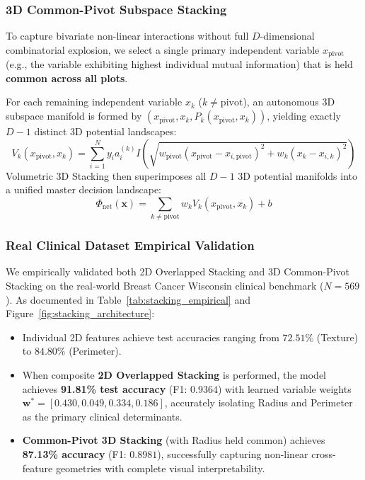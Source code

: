 \documentclass[preprint,review,12pt]{elsarticle}
\begin{document}
\subsubsection{3D Common-Pivot Subspace Stacking}
To capture bivariate non-linear interactions without full $D$-dimensional combinatorial explosion, we select a single primary independent variable $x_{\mathrm{pivot}}$ (e.g., the variable exhibiting highest individual mutual information) that is held \textbf{common across all plots}. 

For each remaining independent variable $x_k$ ($k \ne \mathrm{pivot}$), an autonomous 3D subspace manifold is formed by $(x_{\mathrm{pivot}}, x_k, P_k(x_{\mathrm{pivot}}, x_k))$, yielding exactly $D - 1$ distinct 3D potential landscapes:
\begin{equation}
    V_k(x_{\mathrm{pivot}}, x_k) = \sum_{i=1}^N y_i a_i^{(k)} I\left( \sqrt{w_{\mathrm{pivot}} (x_{\mathrm{pivot}} - x_{i,\mathrm{pivot}})^2 + w_k (x_k - x_{i,k})^2} \right)
\end{equation}
Volumetric 3D Stacking then superimposes all $D - 1$ 3D potential manifolds into a unified master decision landscape:
\begin{equation}
    \Phi_{\mathrm{net}}(\mathbf{x}) = \sum_{k \ne \mathrm{pivot}} w_k V_k(x_{\mathrm{pivot}}, x_k) + b
\end{equation}

\subsubsection{Real Clinical Dataset Empirical Validation}
We empirically validated both 2D Overlapped Stacking and 3D Common-Pivot Stacking on the real-world Breast Cancer Wisconsin clinical benchmark ($N=569$). As documented in Table~\ref{tab:stacking_empirical} and Figure~\ref{fig:stacking_architecture}:
\begin{itemize}
    \item Individual 2D features achieve test accuracies ranging from $72.51\%$ (Texture) to $84.80\%$ (Perimeter).
    \item When composite \textbf{2D Overlapped Stacking} is performed, the model achieves \textbf{91.81\% test accuracy} (F1: $0.9364$) with learned variable weights $\mathbf{w}^* = [0.430, 0.049, 0.334, 0.186]$, accurately isolating Radius and Perimeter as the primary clinical determinants.
    \item \textbf{Common-Pivot 3D Stacking} (with Radius held common) achieves \textbf{87.13\% accuracy} (F1: $0.8981$), successfully capturing non-linear cross-feature geometries with complete visual interpretability.
\end{itemize}
\end{document}
